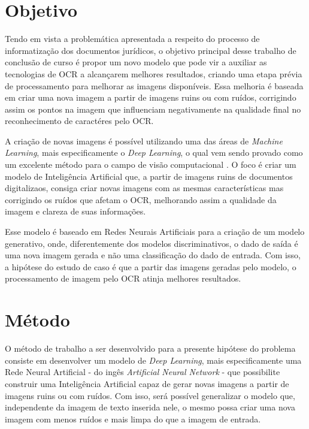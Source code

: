 \newpage

\section{Objetivo}

Tendo em vista a problemática apresentada a respeito do processo de informatização dos documentos jurídicos, o objetivo principal desse trabalho de conclusão de curso é propor um novo modelo que pode vir a auxiliar as tecnologias de OCR a alcançarem melhores resultados, criando uma etapa prévia de processamento para melhorar as imagens disponíveis. Essa melhoria é baseada em criar uma nova imagem a partir de imagens ruins ou com ruídos, corrigindo assim os pontos na imagem que influenciam negativamente na qualidade final no reconhecimento de caractéres pelo OCR.

A criação de novas imagens é possível utilizando uma das áreas de \textit{Machine Learning}, mais especificamente o \textit{Deep Learning}, o qual vem sendo provado como um excelente método para o campo de visão computacional \cite{dl-brief-review}. O foco é criar um modelo de Inteligência Artificial que, a partir de imagens ruins de documentos digitalizaos, consiga criar novas imagens com as mesmas características mas corrigindo os ruídos que afetam o OCR, melhorando assim a qualidade da imagem e clareza de suas informações.

Esse modelo é baseado em Redes Neurais Artificiais para a criação de um modelo generativo, onde, diferentemente dos modelos discriminativos, o dado de saída é uma nova imagem gerada e não uma classificação do dado de entrada. Com isso, a hipótese do estudo de caso é que a partir das imagens geradas pelo modelo, o processamento de imagem pelo OCR atinja melhores resultados.

\section{Método}

O método de trabalho a ser desenvolvido para a presente hipótese do problema consiste em desenvolver um modelo de \textit{Deep Learning}, mais especificamente uma Rede Neural Artificial - do ingês \textit{Artificial Neural Network} - que possibilite construir uma Inteligência Artificial capaz de gerar novas imagens a partir de imagens ruins ou com ruídos. Com isso, será possível generalizar o modelo que, independente da imagem de texto inserida nele, o mesmo possa criar uma nova imagem com menos ruídos e mais limpa do que a imagem de entrada.

